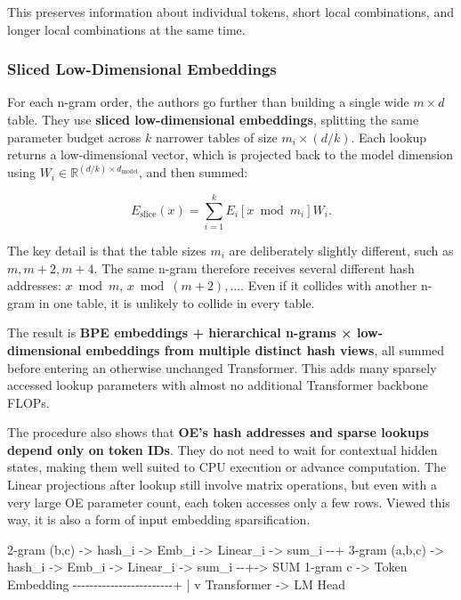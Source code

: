 \documentclass[
  11pt,
  a4paper,
]{article}
\newenvironment{Shaded}{}{}
\newcommand{\NormalTok}[1]{#1}
\newenvironment{NotesFormula}{%
  \par\noindent\begin{minipage}{\linewidth}%
  \setlength{\parindent}{2em}%
  \setlength{\parskip}{0.35em}%
}{\end{minipage}\par}
\begin{document}
This preserves information about individual tokens, short local
combinations, and longer local combinations at the same time.

\subsubsection{Sliced Low-Dimensional
Embeddings}\label{sliced-low-dimensional-embeddings}

\begin{NotesFormula}

For each n-gram order, the authors go further than building a single
wide \(m\times d\) table. They use \textbf{sliced low-dimensional
embeddings}, splitting the same parameter budget across \(k\) narrower
tables of size \(m_i\times(d/k)\). Each lookup returns a low-dimensional
vector, which is projected back to the model dimension using
\(W_i\in\mathbb{R}^{(d/k)\times d_{\mathrm{model}}}\), and then summed:

\[
E_{\mathrm{slice}}(x)=\sum_{i=1}^{k}E_i[x\bmod m_i]W_i.
\]

\end{NotesFormula}

The key detail is that the table sizes \(m_i\) are deliberately slightly
different, such as \(m,m+2,m+4\). The same n-gram therefore receives
several different hash addresses: \(x\bmod m\), \(x\bmod(m+2),\ldots\).
Even if it collides with another n-gram in one table, it is unlikely to
collide in every table.

The result is \textbf{BPE embeddings + hierarchical n-grams ×
low-dimensional embeddings from multiple distinct hash views}, all
summed before entering an otherwise unchanged Transformer. This adds
many sparsely accessed lookup parameters with almost no additional
Transformer backbone FLOPs.

The procedure also shows that \textbf{OE's hash addresses and sparse
lookups depend only on token IDs}. They do not need to wait for
contextual hidden states, making them well suited to CPU execution or
advance computation. The Linear projections after lookup still involve
matrix operations, but even with a very large OE parameter count, each
token accesses only a few rows. Viewed this way, it is also a form of
input embedding sparsification.

\begin{Shaded}
\begin{Highlighting}[]
\NormalTok{2{-}gram (b,c)   {-}\textgreater{} hash\_i {-}\textgreater{} Emb\_i {-}\textgreater{} Linear\_i {-}\textgreater{} sum\_i {-}{-}+}
\NormalTok{3{-}gram (a,b,c) {-}\textgreater{} hash\_i {-}\textgreater{} Emb\_i {-}\textgreater{} Linear\_i {-}\textgreater{} sum\_i {-}{-}+{-}\textgreater{} SUM}
\NormalTok{1{-}gram c      {-}\textgreater{} Token Embedding {-}{-}{-}{-}{-}{-}{-}{-}{-}{-}{-}{-}{-}{-}{-}{-}{-}{-}{-}{-}{-}{-}{-}{-}+     |}
\NormalTok{                                                              v}
\NormalTok{                                                    Transformer {-}\textgreater{} LM Head}
\end{Highlighting}
\end{Shaded}
\end{document}
